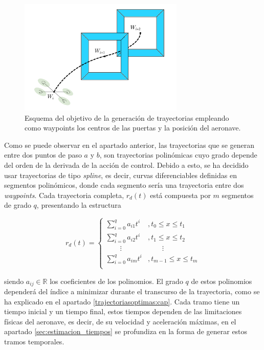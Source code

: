 \begin{figure}[htb!]
	\centering
	\includegraphics[width=0.7\textwidth]{imagenes/TrajCont}
	\caption{Esquema del objetivo de la generación de trayectorias empleando como waypoints los centros de las puertas y la posición del aeronave.}
	\label{TrajCont}
\end{figure}

Como se puede observar en el apartado anterior, las trayectorias que se generan entre dos puntos de paso $a$ y $b$, son trayectorias polinómicas cuyo grado depende del orden de la derivada de la acción de control. Debido a esto, se ha decidido usar trayectorias de tipo \textit{spline}, es decir, curvas diferenciables definidas en segmentos polinómicos, donde cada segmento sería una trayectoria entre dos \textit{waypoints}. Cada trayectoria completa, $r_d(t)$ está compuesta por $m$ segmentos de grado $q$, presentando la estructura

\begin{equation}
	r_d(t) = \left\{ 
	\begin{array}{ll}
		\sum_{i=0}^{q}a_{i1}t^{i} &,t_0\leq x \leq t_1 \\
		\sum_{i=0}^{q}a_{i2}t^{i} &,t_1\leq x \leq t_2 \\
		\qquad\vdots &\qquad\vdots \\
		\sum_{i=0}^{q}a_{im}t^{i} &,t_{m-1}\leq x \leq t_m \\
	\end{array}
	\right.
\end{equation}

siendo $a_{ij}\in \mathbb{R}$ los coeficientes de los polinomios. El grado $q$ de estos polinomios dependerá del índice a minimizar durante el transcurso de la trayectoria, como se ha explicado en el apartado \ref{trajectoriasoptimas:cap}. Cada tramo tiene un tiempo inicial y un tiempo final, estos tiempos dependen de las limitaciones físicas del aeronave, es decir, de su velocidad y aceleración máximas, en el apartado \ref{sec:estimacion_tiempos} se profundiza en la forma de generar estos tramos temporales.

